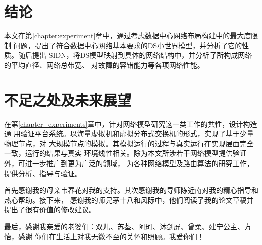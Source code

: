 \documentclass[bachelor,fandolfonts,replaceperiod]{jnuthesis} %
\begin{document}
    \section{结论}
    本文在第\ref{chapter:experiment}章中，通过考虑数据中心网络布局构建中的最大度限制
    问题，提出了符合数据中心网络基本要求的DS小世界模型，并分析了它的性质。随后提出
    SIDN，将DS模型映射到具体的网络结构中，并分析了所构成网络的平均直径、网络总带宽、
    对故障的容错能力等各项网络性能。
    
    \zhlipsum[1-3]
    
    \section{不足之处及未来展望}
    在第\ref{chapter_experiments}章中，针对网络模型研究这一类工作的共性，设计构造通
    用验证平台系统。以海量虚拟机和虚拟分布式交换机的形式，实现了基于少量物理节点，对
    大规模节点的模拟。其模拟运行的过程与真实运行在实现层面完全一致，运行的结果与真实
    环境线性相关。除为本文所涉若干网络模型提供验证外，可进一步推广到更为广泛的领域，
    为各种网络模型及路由算法的研究工作，提供分析、指导与验证。
    
    \begin{backmatter}
    
    \end{backmatter}

    \begin{acknowledgement}
        首先感谢我的母亲韦春花对我的支持。其次感谢我的导师陈近南对我的精心指导和热心帮助。接下来，
        感谢我的师兄茅十八和风际中，他们阅读了我的论文草稿并提出了很有价值的修改建议。
        
        最后，感谢我亲爱的老婆们：双儿、苏荃、阿珂、沐剑屏、曾柔、建宁公主、方怡，感谢
        你们在生活上对我无微不至的关怀和照顾。我爱你们！
    \end{acknowledgement}
    
\end{document}
